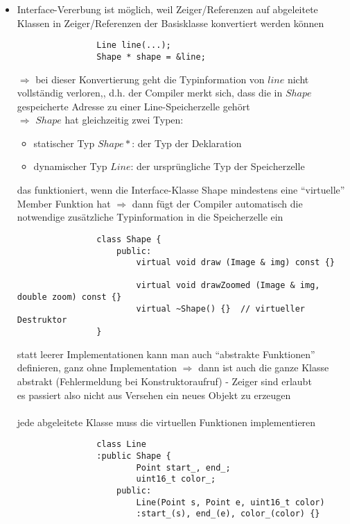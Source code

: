\documentclass{article}
\begin{document}
\begin{itemize}
\begin{itemize}
\begin{tikzpicture}
			\end{tikzpicture}
			\item Interface-Vererbung ist möglich, weil Zeiger/Referenzen auf abgeleitete Klassen in Zeiger/Referenzen der Basisklasse konvertiert werden können
			\begin{lstlisting}
				Line line(...);
				Shape * shape = &line;
			\end{lstlisting}
			$\Rightarrow $ bei dieser Konvertierung geht die Typinformation von $line$ nicht vollständig verloren,, d.h. der Compiler merkt sich, dass die in $Shape$ gespeicherte Adresse zu einer Line-Speicherzelle gehört \\
			$\Rightarrow $ $Shape$ hat gleichzeitig zwei Typen:
			\begin{itemize}
				\item statischer Typ $Shape *$: der Typ der Deklaration
				\item dynamischer Typ $Line$: der ursprüngliche Typ der Speicherzelle
			\end{itemize}
			das funktioniert, wenn die Interface-Klasse Shape mindestens eine ``virtuelle'' Member Funktion hat $\Rightarrow $ dann fügt der Compiler automatisch die notwendige zusätzliche Typinformation in die Speicherzelle ein
			\begin{lstlisting}
				class Shape {
					public:
						virtual void draw (Image & img) const {}

						virtual void drawZoomed (Image & img, double zoom) const {}
						virtual ~Shape() {}  // virtueller Destruktor
				}
			\end{lstlisting}
			statt leerer Implementationen kann man auch ``abstrakte Funktionen'' definieren, ganz ohne Implementation $\Rightarrow $ dann ist auch die ganze Klasse abstrakt (Fehlermeldung bei Konstruktoraufruf) - Zeiger sind erlaubt  \\
			es passiert also nicht aus Versehen ein neues Objekt zu erzeugen \\ \\jede abgeleitete Klasse muss die virtuellen Funktionen implementieren
			\begin{lstlisting}
				class Line
				:public Shape {
						Point start_, end_;
						uint16_t color_;
					public:
						Line(Point s, Point e, uint16_t color)
						:start_(s), end_(e), color_(color) {}


\end{lstlisting}
\end{itemize}
\end{itemize}
\end{document}
